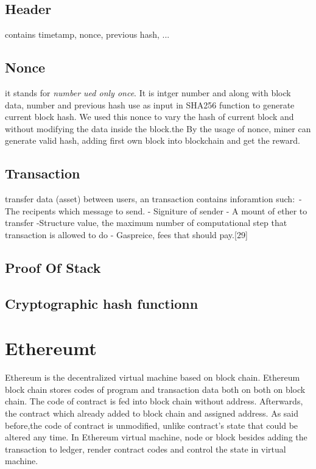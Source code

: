 \subsection{Header} contains timetamp, nonce, previous hash, ...
\subsection{Nonce} it stands for \textit{number ued only once}. It is intger number and along with block data, number and previous hash use as input in SHA256 function to generate current block hash. We used this nonce to vary the hash of current block and without modifying  the data inside the block.the By the usage of nonce, miner can generate valid hash, adding first  own block into blockchain and get the reward.


\subsection{Transaction} transfer data (asset) between users, an transaction contains inforamtion such:\
- The recipents which message to send.
- Signiture of sender 
- A mount of ether to transfer
-Structure value, the maximum number of computational step that transaction is allowed to do 
- Gaspreice, fees that should pay.[29]

\subsection{Proof Of Stack} 

\subsection{Cryptographic hash functionn}
\section{Ethereumt}
Ethereum is the decentralized virtual machine based on block chain. Ethereum block chain stores codes of program and transaction data both on both on block chain. The code of contract is fed into block chain without address. Afterwards, the contract which already added to block chain and assigned address. As said before,the code of contract is unmodified, unlike contract's state that could be altered any time.
In Ethereum virtual machine, node or block besides adding the transaction to ledger, render contract codes and control the state in virtual machine.\\


